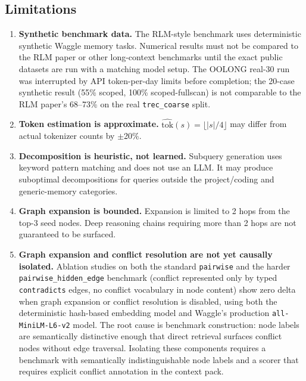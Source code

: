 \documentclass[conference]{IEEEtran}
\begin{document}
\subsection{Limitations}

\begin{enumerate}
\item \textbf{Synthetic benchmark data.}
The RLM-style benchmark uses deterministic synthetic Waggle memory tasks. Numerical results
must not be compared to the RLM paper or other long-context benchmarks until the exact
public datasets are run with a matching model setup. The OOLONG real-30 run was interrupted
by API token-per-day limits before completion; the 20-case synthetic result (55\% scoped,
100\% scoped-fullscan) is not comparable to the RLM paper's 68--73\% on the real
\texttt{trec\_coarse} split.

\item \textbf{Token estimation is approximate.}
$\widehat{\text{tok}}(s) = \lfloor |s|/4 \rfloor$ may differ from actual tokenizer counts
by $\pm$20\%.

\item \textbf{Decomposition is heuristic, not learned.} Subquery generation uses keyword
pattern matching and does not use an LLM. It may produce suboptimal decompositions for
queries outside the project/coding and generic-memory categories.

\item \textbf{Graph expansion is bounded.} Expansion is limited to 2 hops from the top-3
seed nodes. Deep reasoning chains requiring more than 2 hops are not guaranteed to be
surfaced.

\item \textbf{Graph expansion and conflict resolution are not yet causally isolated.}
Ablation studies on both the standard \texttt{pairwise} and the harder
\texttt{pairwise\_hidden\_edge} benchmark (conflict represented only by typed
\texttt{contradicts} edges, no conflict vocabulary in node content) show zero delta when
graph expansion or conflict resolution is disabled, using both the deterministic hash-based
embedding model and Waggle's production \texttt{all-MiniLM-L6-v2} model. The root cause is
benchmark construction: node labels are semantically distinctive enough that direct
retrieval surfaces conflict nodes without edge traversal. Isolating these components
requires a benchmark with semantically indistinguishable node labels and a scorer that
requires explicit conflict annotation in the context pack.


\end{enumerate}
\end{document}
